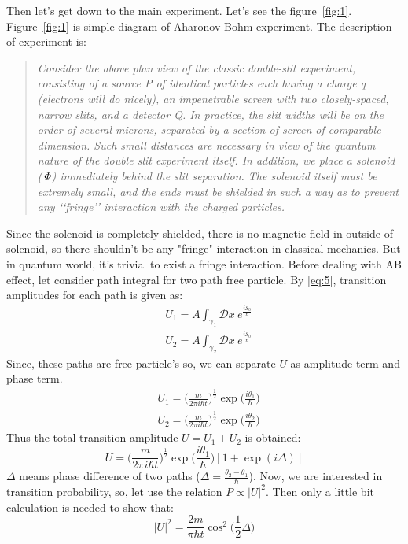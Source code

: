 \documentclass[%
 reprint,
 amsmath,amssymb,
 aps,
]{revtex4-1}
\begin{document}
Then let's get down to the main experiment. Let's see the figure~\ref{fig:1}.
Figure~\ref{fig:1} is simple diagram of Aharonov-Bohm experiment. The description of experiment is: \cite{experiment}
\begin{quote}
\textit{Consider the above plan view of the classic double-slit experiment, consisting of a source P of identical particles
each having a charge q (electrons will do nicely), an impenetrable screen with two closely-spaced, narrow slits,
and a detector Q. In practice, the slit widths will be on the order of several microns, separated by a section of
screen of comparable dimension. Such small distances are necessary in view of the quantum nature of the double
slit experiment itself. In addition, we place a solenoid ($\it\Phi$) immediately behind the slit separation. The solenoid
itself must be extremely small, and the ends must be shielded in such a way as to prevent any ‘‘fringe’’ interaction
with the charged particles.}
\end{quote}
Since the solenoid is completely shielded, there is no magnetic field in outside of solenoid, so there shouldn't be any "fringe" interaction in classical mechanics. But in quantum world, it's trivial to exist a fringe interaction. Before dealing with AB effect, let consider path integral for two path free particle. By \eqref{eq:5}, transition amplitudes for each path is given as:
\begin{equation}\label{eq:7}
\begin{split}
&U_1=A\int_{\gamma_1}\mathcal{D}x\ e^{\frac{i\mathcal{S}_0}{\hbar}}\\
&U_2=A\int_{\gamma_2}\mathcal{D}x\ e^{\frac{i\mathcal{S}_0}{\hbar}}
\end{split}
\end{equation}
Since, these paths are free particle's so, we can separate $U$ as amplitude term and phase term.
\begin{equation}\label{eq:8}
\begin{split}
&U_1=\Big(\frac{m}{2\pi i\hbar t}\Big)^{\frac{1}{2}}\exp\Big(\frac{i\theta_1}{\hbar}\Big)\\
&U_2=\Big(\frac{m}{2\pi i\hbar t}\Big)^{\frac{1}{2}}\exp\Big(\frac{i\theta_2}{\hbar}\Big)
\end{split}
\end{equation}
Thus the total transition amplitude \(U=U_1+U_2\) is obtained: 
\begin{equation}\label{eq:9}
U=\Big(\frac{m}{2\pi i\hbar t}\Big)^{\frac{1}{2}}\exp\Big(\frac{i\theta_1}{\hbar}\Big)[1+\exp(i\Delta)]
\end{equation}
$\Delta$ means phase difference of two paths (\(\Delta=\frac{\theta_2-\theta_1}{\hbar}\)). Now, we are interested in transition probability, so, let use the relation $P\propto |U|^2$. Then only a little bit calculation is needed to show that:
\begin{equation}\label{eq:10}
|U|^2=\frac{2m}{\pi\hbar t}\cos^2\Big(\frac{1}{2}\Delta\Big)
\end{equation}
\end{document}
